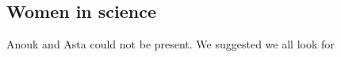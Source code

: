 \subsection{Women in science}
\label{task:20180228_cj1}

Anouk and Asta could not be present. We suggested we all look for 

